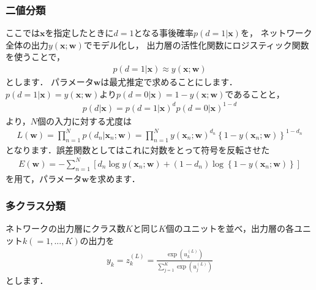 \documentclass[a4paper,10pt]{jsarticle}
\theoremstyle{definition}
\newcommand{\eq}[1]{\begin{align}#1\end{align}}
\begin{document}
\subsubsection{二値分類}
ここでは$\mathbf{x}$を指定したときに$d=1$となる事後確率$p(d=1|\mathbf{x})$を，
ネットワーク全体の出力$y(\mathbf{x};\mathbf{w})$でモデル化し，
出力層の活性化関数にロジスティック関数を使うことで，
\eq{p(d=1|\mathbf{x})\approx y(\mathbf{x};\mathbf{w})}
とします．
パラメータ$\mathbf{w}$は最尤推定で求めることにします．
$p(d=1|\mathbf{x})=y(\mathbf{x};\mathbf{w})$より$p(d=0|\mathbf{x})=1-y(\mathbf{x};\mathbf{w})$であることと，
\eq{p(d|\mathbf{x})=p(d=1|\mathbf{x})^dp(d=0|\mathbf{x})^{1-d}}
より，$N$個の入力に対する尤度は
\eq{L(\mathbf{w})=\prod_{n=1}^Np(d_n|\mathbf{x}_n;\mathbf{w})=\prod_{n=1}^Ny(\mathbf{x}_n;\mathbf{w})^{d_n}\left\{1-y(\mathbf{x}_n;\mathbf{w})\right\}^{1-d_n}}
となります．誤差関数としてはこれに対数をとって符号を反転させた
\eq{E(\mathbf{w})=-\sum_{n=1}^N\left[d_n\log y(\mathbf{x}_n;\mathbf{w})+(1-d_n)\log\left\{1-y(\mathbf{x}_n;\mathbf{w})\right\}\right]}
を用て，パラメータ$\mathbf{w}$を求めます．
%
\subsubsection{多クラス分類}
ネトワークの出力層にクラス数$K$と同じ$K$個のユニットを並べ，出力層の各ユニット$k(=1,...,K)$の出力を
\eq{y_k=z_k^{(L)}=\frac{\exp(u_k^{(L)})}{\sum_{j=1}^K\exp(u_j^{(L)})}}
とします．
\end{document}
